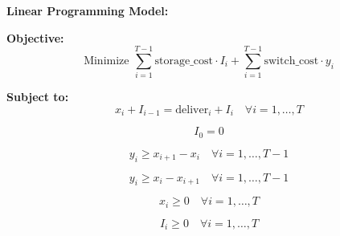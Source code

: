 \documentclass{article}
\begin{document}
\textbf{Linear Programming Model:}

\textbf{Objective:}
\[
\text{Minimize } \sum_{i=1}^{T-1} \text{storage\_cost} \cdot I_i + \sum_{i=1}^{T-1} \text{switch\_cost} \cdot y_i
\]

\textbf{Subject to:}
\[
x_i + I_{i-1} = \text{deliver}_i + I_i \quad \forall i = 1, \ldots, T
\]

\[
I_0 = 0
\]

\[
y_i \geq x_{i+1} - x_i \quad \forall i = 1, \ldots, T-1
\]

\[
y_i \geq x_i - x_{i+1} \quad \forall i = 1, \ldots, T-1
\]

\[
x_i \geq 0 \quad \forall i = 1, \ldots, T
\]

\[
I_i \geq 0 \quad \forall i = 1, \ldots, T
\]
\end{document}
